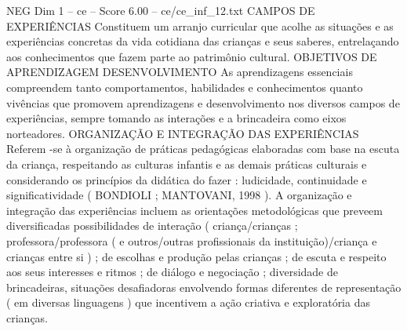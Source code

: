 \begin{textsample}{NEG Dim 1 – ce – Score 6.00 – ce/ce\_inf\_12.txt}
CAMPOS DE EXPERIÊNCIAS Constituem um arranjo curricular que acolhe as situações e as experiências concretas da vida cotidiana das crianças e seus saberes, entrelaçando aos conhecimentos que fazem parte ao patrimônio cultural.
OBJETIVOS DE APRENDIZAGEM DESENVOLVIMENTO As aprendizagens essenciais compreendem tanto comportamentos, habilidades e conhecimentos quanto vivências que promovem aprendizagens e desenvolvimento nos diversos campos de experiências, sempre tomando as interações e a brincadeira como eixos norteadores.
ORGANIZAÇÃO E INTEGRAÇÃO DAS EXPERIÊNCIAS Referem -se à organização de práticas pedagógicas elaboradas com base na escuta da criança, respeitando as culturas infantis e as demais práticas culturais e considerando os princípios da didática do fazer : ludicidade, continuidade e significatividade ( BONDIOLI ; MANTOVANI, 1998 ).
A organização e integração das experiências incluem as orientações metodológicas que preveem diversificadas possibilidades de interação ( criança/crianças ; professora/professora ( e outros/outras profissionais da instituição)/criança e crianças entre si ) ; de escolhas e produção pelas crianças ; de escuta e respeito aos seus interesses e ritmos ; de diálogo e negociação ; diversidade de brincadeiras, situações desafiadoras envolvendo formas diferentes de representação ( em diversas linguagens ) que incentivem a ação criativa e exploratória das crianças.

\end{textsample}
